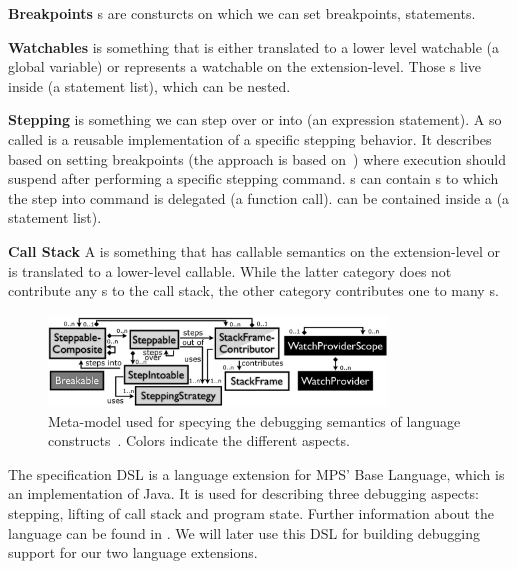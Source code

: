 \noindent \textbf{Breakpoints} s are consturcts on which we can
set breakpoints, \eg statements.

\noindent \textbf{Watchables}  is something that is either
translated to a lower level watchable (\eg a global variable) or represents a watchable on the
extension-level.
Those s live inside  (\eg a
statement list), which can be nested. 

\noindent \textbf{Stepping}  is something we can step
over or into (\eg an expression statement). A so called  is
a reusable implementation of a specific stepping behavior. It describes based on
setting breakpoints (the approach is based on~\cite{Wu06grammar}) where
execution should suspend after performing a specific stepping command.
s can contain s
to which the step into command is delegated (\eg a function call).
 can be contained inside a  (\eg a
statement list).

\noindent \textbf{Call Stack} A  is
something that has callable semantics on the extension-level or is
translated to a lower-level callable. While the latter category does not
contribute any s to the call stack, the other category
contributes one to many s.






\begin{figure}[h]
  \vspace{-2mm}
  \centering
    \includegraphics[width=9cm]{./figures/debugger-concepts.png} 
    \vspace{-2mm}
    \caption{Meta-model used for specying the debugging semantics of language
    constructs~\cite{DBLP:conf/adaEurope/AdaEuropeDeb}. Colors indicate the
    different aspects.} 
  \label{specabs}
  \vspace{-2mm}
\end{figure}

The specification \ac{DSL} is a language extension for MPS' Base Language,
which is an implementation of Java. It is used for describing three
debugging aspects: stepping, lifting of call stack and program state. Further
information about the language can be found in
\cite{DBLP:conf/adaEurope/AdaEuropeDeb}. We will later use this \ac{DSL} for
building debugging support for our two language extensions. 


